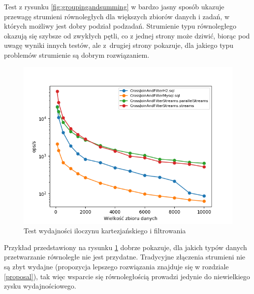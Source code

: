\documentclass[12pt,twoside,openright]{extarticle}
\begin{document}
    Test z rysunku \ref{fig:groupingandsumming} w bardzo jasny sposób ukazuje przewagę strumieni równoległych dla większych zbiorów danych i zadań, w których możliwy jest dobry podział podzadań. Strumienie typu równoległego okazują się szybsze od zwykłych pętli, co z jednej strony może dziwić, biorąc pod uwagę wyniki innych testów, ale z~drugiej strony pokazuje, dla jakiego typu problemów strumienie są dobrym rozwiązaniem.

\newpage
\begin{figure}[H]
\centering
\includegraphics[width=15cm]{plots/CrossJoinAndFilter}
\caption{Test wydajności iloczynu kartezjańskiego i filtrowania}
    \label{fig:crossjoinandfilter}
\end{figure}

    Przykład przedstawiony na rysunku \ref{fig:crossjoinandfilter} dobrze pokazuje, dla jakich typów danych przetwarzanie równoległe nie jest przydatne. Tradycyjne złączenia strumieni nie są zbyt wydajne (propozycja lepszego rozwiązania znajduje się w rozdziale \ref{proposal}), tak więc wsparcie się równoległością prowadzi jedynie do niewielkiego zysku wydajnościowego.
\end{document}

